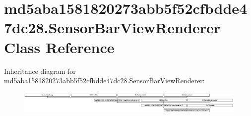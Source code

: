 \hypertarget{classmd5aba1581820273abb5f52cfbdde47dc28_1_1SensorBarViewRenderer}{}\section{md5aba1581820273abb5f52cfbdde47dc28.\+Sensor\+Bar\+View\+Renderer Class Reference}
\label{classmd5aba1581820273abb5f52cfbdde47dc28_1_1SensorBarViewRenderer}
Inheritance diagram for md5aba1581820273abb5f52cfbdde47dc28.\+Sensor\+Bar\+View\+Renderer\+:\begin{figure}[H]
\begin{center}
\leavevmode
\includegraphics[height=1.098039cm]{classmd5aba1581820273abb5f52cfbdde47dc28_1_1SensorBarViewRenderer}
\end{center}
\end{figure}
